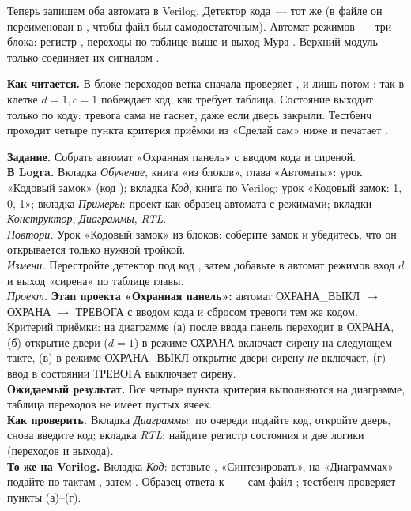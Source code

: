 Теперь запишем оба автомата в Verilog. Детектор кода~--- тот же 
(в файле он переименован в , чтобы файл был
самодостаточным). Автомат режимов~--- три блока: регистр , переходы
по таблице выше и выход Мура . Верхний модуль 
только соединяет их сигналом .


\textbf{Как читается.} В блоке переходов ветка  сначала проверяет
, и лишь потом : так в клетке $d{=}1,c{=}1$ побеждает код,
как требует таблица. Состояние  выходит только по коду: тревога
сама не гаснет, даже если дверь закрыли. Тестбенч 
проходит четыре пункта критерия приёмки из «Сделай сам» ниже и печатает
.

\begin{diybox}
\textbf{Задание.} Собрать автомат «Охранная панель» с вводом кода 
и сиреной.\\
\textbf{В Logra.} Вкладка \emph{Обучение}, книга «из блоков», глава
«Автоматы»: урок «Кодовый замок» (код ); вкладка \emph{Код},
книга по Verilog: урок «Кодовый замок: 1, 0, 1»; вкладка \emph{Примеры}:
проект  как образец автомата с режимами; вкладки
\emph{Конструктор}, \emph{Диаграммы}, \emph{RTL}.\\
 \emph{Повтори.} Урок «Кодовый замок» из блоков: соберите замок и
убедитесь, что он открывается только нужной тройкой.\\
 \emph{Измени.} Перестройте детектор под код , затем
добавьте в автомат режимов вход $d$ и выход «сирена» по таблице главы.\\
 \emph{Проект.} \textbf{Этап проекта «Охранная панель»:} автомат
ОХРАНА\_ВЫКЛ $\to$ ОХРАНА $\to$ ТРЕВОГА с вводом кода  и сбросом
тревоги тем же кодом. Критерий приёмки: на диаграмме (а) после ввода 
панель переходит в ОХРАНА, (б) открытие двери ($d=1$) в режиме ОХРАНА включает
сирену на следующем такте, (в) в режиме ОХРАНА\_ВЫКЛ открытие двери сирену
\emph{не} включает, (г) ввод  в состоянии ТРЕВОГА выключает сирену.\\
\textbf{Ожидаемый результат.} Все четыре пункта критерия выполняются на
диаграмме, таблица переходов не имеет пустых ячеек.\\
\textbf{Как проверить.} Вкладка \emph{Диаграммы}: по очереди подайте код,
откройте дверь, снова введите код; вкладка \emph{RTL}: найдите регистр
состояния и две логики (переходов и выхода).\\
\textbf{То же на Verilog.} Вкладка \emph{Код}: вставьте ,
«Синтезировать», на «Диаграммах» подайте  по тактам
, затем . Образец ответа к ~--- сам файл
; тестбенч  проверяет пункты (а)--(г).
\end{diybox}


